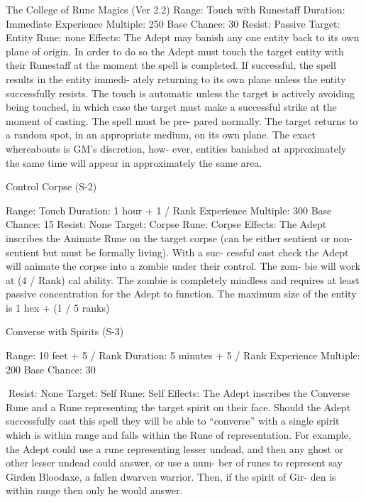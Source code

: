 \begin{Chapter}{The College of Rune Magics (Ver 2.2)}
Range: Touch with Runestaff 
Duration: Immediate 
Experience Multiple: 250 
Base Chance: 30%
Resist: Passive 
Target: Entity  
Rune: none 
Effects: The Adept may banish any one entity back 
to  its  own  plane  of  origin.  In  order  to  do  so  the 
Adept  must  touch  the  target  entity  with  their 
Runestaff at  the  moment  the  spell  is completed.  If 
successful,  the  spell  results  in  the  entity  immedi-
ately  returning  to  its  own  plane  unless  the  entity 
successfully  resists.  The  touch  is  automatic  unless 
the  target  is  actively  avoiding  being  touched,  in 
which case the target must make a successful strike 
at  the  moment  of  casting.  The  spell  must  be  pre-
pared  normally.  The  target  returns  to  a  random 
spot,  in  an  appropriate  medium,  on  its  own  plane. 
The  exact  whereabouts  is  GM’s  discretion,  how-
ever,  entities  banished  at  approximately  the  same 
time will appear in approximately the same area. 

Control Corpse (S-2) 

Range: Touch 
Duration: 1 hour + 1 / Rank 
Experience Multiple: 300 
Base Chance: 15%
Resist: None 
Target: Corpse  
Rune: Corpse 
Effects: The Adept inscribes the Animate Rune on 
the  target  corpse  (can  be  either  sentient  or  non-
sentient  but  must  be  formally  living).  With  a  suc-
cessful  cast  check  the  Adept  will  animate  the 
corpse into a zombie under their control. The zom-
bie will work at (4 / Rank)%
cal ability. The zombie is completely mindless and 
requires  at  least  passive  concentration  for  the 
Adept to function. The maximum size of the entity 
is 1 hex + (1 / 5 ranks) 

Converse with Spirits (S-3) 

Range: 10 feet + 5 / Rank 
Duration: 5 minutes + 5 / Rank 
Experience Multiple: 200 
Base Chance: 30%

Resist: None 
Target: Self  
Rune: Self 
Effects:  The  Adept  inscribes  the  Converse  Rune 
and  a  Rune  representing  the  target  spirit  on  their 
face.  Should  the  Adept  successfully  cast  this  spell 
they will be able to “converse” with a single spirit 
which is within range and falls within the Rune of 
representation. For example, the Adept could use a 
rune representing lesser undead, and then any ghost 
or other lesser undead could answer, or use a num-
ber  of  runes  to  represent  say  Girden  Bloodaxe,  a 
fallen  dwarven  warrior.  Then,  if  the  spirit  of  Gir-
den is within range then only he would answer. 


\end{Chapter}
